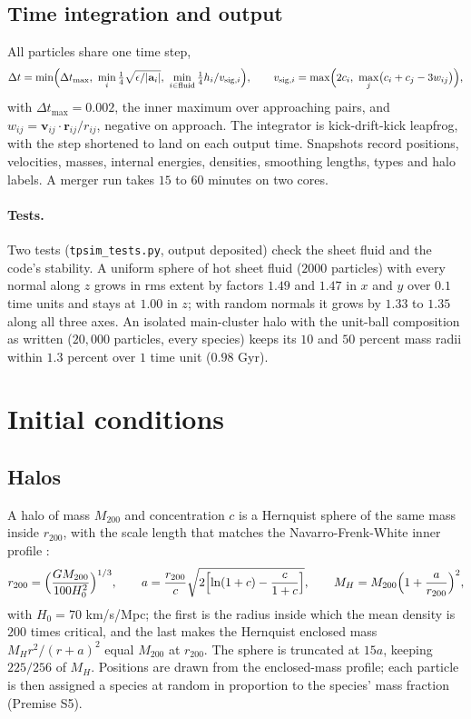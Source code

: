 \documentclass[11pt]{article}
\theoremstyle{definition}
\newcommand{\file}[1]{\texttt{#1}}
\begin{document}
\subsection{Time integration and output}

All particles share one time step,
\[
\Delta t = \min\Bigl(\Delta t_{\max},\ \min_{i}\tfrac{1}{4}\sqrt{\epsilon/|\mathbf{a}_{i}|},\ \min_{i\in\text{fluid}}\tfrac{1}{4}h_{i}/v_{\mathrm{sig},i}\Bigr),\qquad
v_{\mathrm{sig},i} = \max\Bigl(2c_{i},\ \max_{j}\bigl(c_{i} + c_{j} - 3w_{ij}\bigr)\Bigr),
\]
with $\Delta t_{\max} = 0.002$, the inner maximum over approaching pairs, and $w_{ij} = \mathbf{v}_{ij}\cdot\mathbf{r}_{ij}/r_{ij}$, negative on approach. The integrator is kick-drift-kick leapfrog, with the step shortened to land on each output time. Snapshots record positions, velocities, masses, internal energies, densities, smoothing lengths, types and halo labels. A merger run takes $15$ to $60$ minutes on two cores.

\paragraph{Tests.} Two tests (\file{tpsim\_tests.py}, output deposited) check the sheet fluid and the code's stability. A uniform sphere of hot sheet fluid ($2000$ particles) with every normal along $z$ grows in rms extent by factors $1.49$ and $1.47$ in $x$ and $y$ over $0.1$ time units and stays at $1.00$ in $z$; with random normals it grows by $1.33$ to $1.35$ along all three axes. An isolated main-cluster halo with the unit-ball composition as written ($20{,}000$ particles, every species) keeps its $10$ and $50$ percent mass radii within $1.3$ percent over $1$ time unit ($0.98$ Gyr).

\section{Initial conditions}\label{sec:ics}

\subsection{Halos}

A halo of mass $M_{200}$ and concentration $c$ is a Hernquist sphere of the same mass inside $r_{200}$, with the scale length that matches the Navarro-Frenk-White inner profile \cite{Hernquist1990, NFW1997, SpringelDiMatteoHernquist2005}:
\[
r_{200} = \Bigl(\frac{GM_{200}}{100H_{0}^{2}}\Bigr)^{1/3},\qquad
a = \frac{r_{200}}{c}\sqrt{2\Bigl[\ln(1 + c) - \frac{c}{1 + c}\Bigr]},\qquad
M_{H} = M_{200}\Bigl(1 + \frac{a}{r_{200}}\Bigr)^{2},
\]
with $H_{0} = 70$ km/s/Mpc; the first is the radius inside which the mean density is $200$ times critical, and the last makes the Hernquist enclosed mass $M_{H}r^{2}/(r + a)^{2}$ equal $M_{200}$ at $r_{200}$. The sphere is truncated at $15a$, keeping $225/256$ of $M_{H}$. Positions are drawn from the enclosed-mass profile; each particle is then assigned a species at random in proportion to the species' mass fraction (Premise S5).
\end{document}
